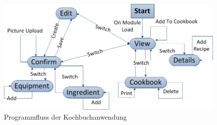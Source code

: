 \begin{figure}[htbp]
    \centering
    \includegraphics[scale=0.7]{images/programflow.png}
    \caption{Programmfluss der Kochbuchanwendung}
    \label{jsp_pflow}
\end{figure}

